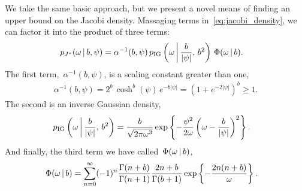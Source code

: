 We take the same basic approach, but we present a novel means of
finding an upper bound on the Jacobi density.  Massaging terms
in~\eqref{eq:jacobi_density}, we can factor it into the product of
three terms:
\begin{align*}
  p_{J^{*}}({\omega} \,|\, b,\psi) &= 
   \alpha^{-1}(b,\psi) \,
   p_{\mathrm{IG}}\left({\omega} \, \bigg| \, \frac{b}{|\psi|}, \, b^2 \right) \,
   \Phi({\omega} \,|\, b).
\end{align*}
The first term,~$\alpha^{-1}(b,\psi)$, is a scaling constant greater than one,
\begin{align*}
  \alpha^{-1}(b,\psi) = 2^b \, \cosh^b(\psi) \, e^{-b|\psi|} 
  = \left(1 + e^{-2|\psi|} \right)^b \geq 1.
\end{align*}
The second is an inverse Gaussian density,
\begin{align*}
p_{\mathrm{IG}} \left({\omega} \, \bigg| \, \frac{b}{|\psi|}, \, b^2 \right) 
  &= \frac{b}{\sqrt{2\pi {\omega}^3}}
    \exp \left \{ - \frac{\psi^2}{2{\omega}}  \left({\omega} - \frac{b}{|\psi|} \right)^2   \right \}.
\end{align*}
And finally, the third term we have called~$\Phi({\omega} \,|\, b)$, 
\begin{align*}
  \Phi({\omega} \,|\, b)  
  &= \sum_{n=0}^\infty (-1)^n \frac{\Gamma(n+b)}{\Gamma(n+1)} \frac{2n+b}{\Gamma(b+1)}
    \exp\left\{- \frac{2n(n+b)}{{\omega}} \right\}.  
\end{align*}


